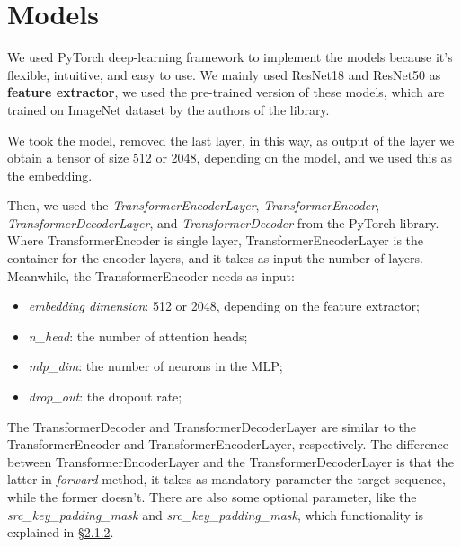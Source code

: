 \section{Models}\label{sec:models}

We used PyTorch deep-learning framework to implement the models because it's flexible, intuitive, and easy to use.
We mainly used ResNet18 and ResNet50 as \textbf{feature extractor}, we used the pre-trained version of these models, which are trained on ImageNet dataset by the authors of the library.

We took the model, removed the last layer, in this way, as output of the layer we obtain a tensor of size 512 or 2048, depending on the model, and we used this as the embedding.

Then, we used the \textit{TransformerEncoderLayer}, \textit{TransformerEncoder}, \textit{TransformerDecoderLayer}, and \textit{TransformerDecoder} from the PyTorch library.
Where TransformerEncoder is single layer, TransformerEncoderLayer is the container for the encoder layers, and it takes as input the number of layers.
Meanwhile, the TransformerEncoder needs as input:
\begin{itemize}
    \item \textit{embedding dimension}: 512 or 2048, depending on the feature extractor;
    \item \textit{n\_head}: the number of attention heads;
    \item \textit{mlp\_dim}: the number of neurons in the MLP;
    \item \textit{drop\_out}: the dropout rate;
\end{itemize}
The TransformerDecoder and TransformerDecoderLayer are similar to the TransformerEncoder and TransformerEncoderLayer, respectively.
The difference between TransformerEncoderLayer and the TransformerDecoderLayer is that the latter in \textit{forward} method, it takes as mandatory parameter the target sequence, while the former doesn't.
There are also some optional parameter, like the \textit{src\_key\_padding\_mask} and \textit{src\_key\_padding\_mask}, which functionality is explained in \hyperref[subsec:transformer]{\S2.1.2}.